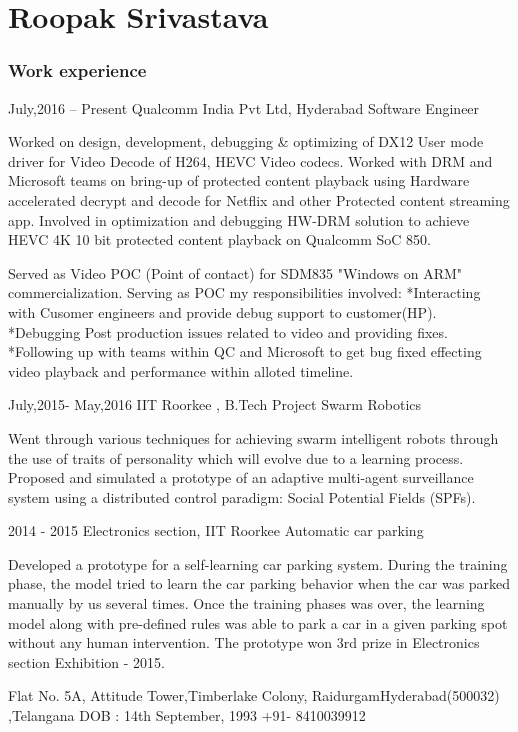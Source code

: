 \documentclass{tccv}
\begin{document}
\part{Roopak Srivastava}

\section{Work experience}

\begin{eventlist}

\item{July,2016 -- Present}
     {Qualcomm India Pvt Ltd, Hyderabad}
     {Software Engineer}
     
Worked on design, development, debugging & optimizing of DX12 User mode driver for Video Decode of H264, HEVC Video codecs. Worked with DRM and Microsoft teams on bring-up of protected content playback using Hardware accelerated decrypt and decode for Netflix and other Protected content streaming app. Involved in optimization and debugging HW-DRM solution to achieve HEVC 4K 10 bit protected content playback on Qualcomm SoC 850.

Served as Video POC (Point of contact) for SDM835 "Windows on ARM" commercialization. Serving as POC my responsibilities involved:\hfill \break
*Interacting with Cusomer engineers and provide debug support to customer(HP).\hfill \break
*Debugging Post production issues related to video and providing fixes.\hfill \break
*Following up with teams within QC and Microsoft to get bug fixed effecting video playback and performance within alloted timeline.\hfill \break

\item{July,2015- May,2016}
     {IIT Roorkee , B.Tech Project}
     {Swarm Robotics}
     
Went through various techniques for achieving swarm intelligent robots through the use of traits of personality which will evolve due to a learning process. Proposed and simulated a prototype of an adaptive multi-agent surveillance system using a distributed control paradigm: Social Potential Fields (SPFs).

\item{2014 - 2015}
     {Electronics section, IIT Roorkee}
     {Automatic car parking}

Developed a prototype for a self-learning car parking system. During the training phase, the model tried to learn the car parking behavior when the car was parked
manually by us several times. Once the training phases was over, the learning model along with pre-defined rules was able to park a car in a given parking spot without any human intervention. The prototype won 3rd prize in Electronics section Exhibition - 2015.

\end{eventlist}
\personal
    {Flat No. 5A, Attitude Tower,\newline Timberlake Colony, Raidurgam\newline Hyderabad(500032) ,Telangana}
    {DOB : 14th September, 1993}
    {+91- 8410039912}
\end{document}
